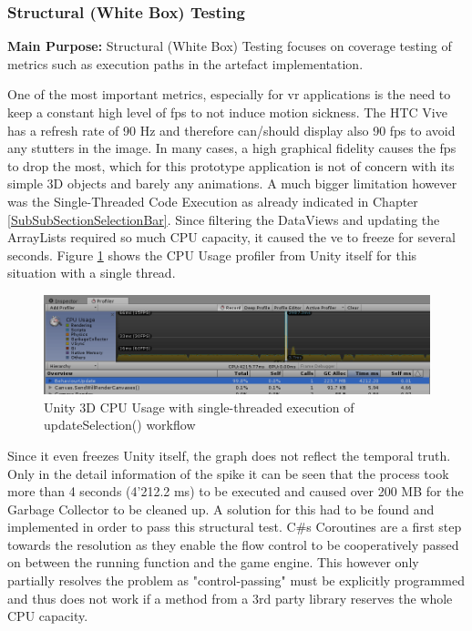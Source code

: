 \subsubsection{Structural (White Box) Testing}

\textbf{Main Purpose:} Structural (White Box) Testing focuses on coverage testing of metrics such as execution paths in the artefact implementation.

One of the most important metrics, especially for \gls{vr} applications is the need to keep a constant high level of \gls{fps} to not induce motion sickness. The HTC Vive has a refresh rate of 90 Hz and therefore can/should display also 90 \gls{fps} to avoid any stutters in the image. In many cases, a high graphical fidelity causes the \gls{fps} to drop the most, which for this prototype application is not of concern with its simple 3D objects and barely any animations. A much bigger limitation however was the Single-Threaded Code Execution as already indicated in Chapter \ref{SubSubSectionSelectionBar}. Since filtering the DataViews and updating the ArrayLists required so much CPU capacity, it caused the \gls{ve} to freeze for several seconds. Figure \ref{fig:unityprofilesingle} shows the CPU Usage profiler from Unity itself for this situation with a single thread.
\begin{figure}[b]
	\begin{center}
		\includegraphics[width=15cm]{03_Figures/08_Development/CPU_Usage_Singlethreaded.png}
		\caption{Unity 3D CPU Usage with single-threaded execution of updateSelection() workflow}
		\label{fig:unityprofilesingle}
	\end{center}
\end{figure}
Since it even freezes Unity itself, the graph does not reflect the temporal truth. Only in the detail information of the spike it can be seen that the process took more than 4 seconds (4'212.2 ms) to be executed and caused over 200 MB for the Garbage Collector to be cleaned up. A solution for this had to be found and implemented in order to pass this structural test. C\#s Coroutines are a first step towards the resolution as they enable the flow control to be cooperatively passed on between the running function and the game engine. This however only partially resolves the problem as "control-passing" must be explicitly programmed and thus does not work if a method from a 3rd party library reserves the whole CPU capacity.\newline
